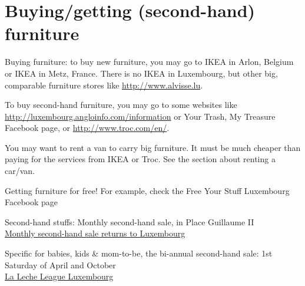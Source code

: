 \section{Buying/getting (second-hand) furniture}

Buying furniture: to buy new furniture, you may go to IKEA in Arlon, Belgium or IKEA in Metz, France.
There is no IKEA in Luxembourg, but other big, comparable furniture stores like \url{http://www.alvisse.lu}. 

To buy second-hand furniture, you may go to some websites like \url{http://luxembourg.angloinfo.com/information}
or Your Trash, My Treasure Facebook page, or \url{http://www.troc.com/en/}. 

You may want to rent a van to carry big furniture. 
It must be much cheaper than paying for the services from IKEA or Troc. 
See the section about renting a car/van.  

Getting furniture for free! For example, check the Free Your Stuff Luxembourg Facebook page

Second-hand stuffs: Monthly second-hand sale, in Place Guillaume II \\ 
\href{http://www.wort.lu/en/view/monthly-second-hand-sale-returns-to-luxembourg-515adfcde4b0bd54e4d1d182}{Monthly second-hand sale returns to Luxembourg}

Specific for babies, kids \& mom-to-be, the bi-annual second-hand sale: 1st Saturday of April and October \\ 
\href{http://www.lalecheleague.lu/index.php?menu=43\&page=\&portal=9\&lang=}{La Leche League Luxembourg}
